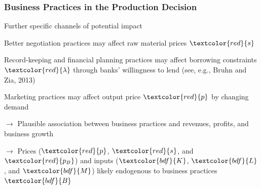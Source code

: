 \documentclass[hideothersubsections, usenames,dvipsnames,11pt]{beamer}
\newenvironment{itemize_2pt}{\itemize\addtolength{\itemsep}{2pt}}{\enditemize}
\newenvironment{enumerate_2pt}{\enumerate\addtolength{\itemsep}{2pt}}{\endenumerate}
\begin{document}
\begin{frame}
\frametitle{Business Practices in the Production Decision}

\begin{itemize_2pt}

	\item \normalsize Further specific channels of potential impact
	\begin{enumerate_2pt}
		\item Better \textcolor{bdf}{negotiation practices} may affect raw material prices $\textcolor{red}{s}$
		\item \textcolor{bdf}{Record-keeping} and \textcolor{bdf}{financial planning practices} may affect borrowing constraints $\textcolor{red}{\lambda}$ through banks' willingness to lend (see, e.g., \textcolor{camel}{Bruhn and Zia, 2013})
		\item \textcolor{bdf}{Marketing practices} may affect output price $\textcolor{red}{p}$ by changing demand

\vspace{1.0em}

		\item[] $\rightarrow$ Plausible association between business practices and revenues, profits, and business growth
		
\vspace{0.5em}		
		
		\item[] $\rightarrow$ Prices ($\textcolor{red}{p}$, $\textcolor{red}{s}$, and $\textcolor{red}{p_{B}}$) and inputs ($\textcolor{bdf}{K}$, $\textcolor{bdf}{L}$, and $\textcolor{bdf}{M}$) likely endogenous to business practices $\textcolor{bdf}{B}$
	\end{enumerate_2pt}
\end{itemize_2pt}

\end{frame}
\end{document}
